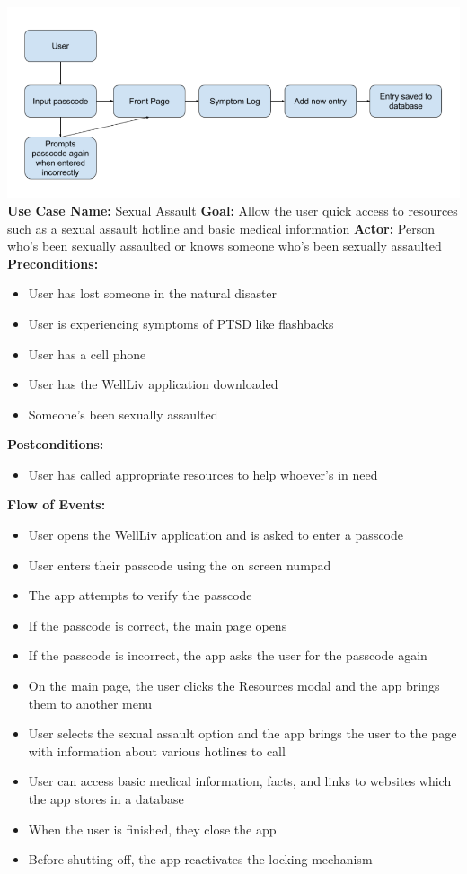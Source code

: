 \documentclass[letterpaper,12pt,titlepage]{article}
\begin{document}
\includegraphics[scale=.4]{Case1}
\newline
\newline
\textbf{Use Case Name:} Sexual Assault
\newline
\newline
\textbf{Goal:} Allow the user quick access to resources such as a sexual assault hotline and basic medical information
\newline
\newline
\textbf{Actor:} Person who’s been sexually assaulted or knows someone who’s been sexually assaulted
\newline
\newline
\textbf{Preconditions:}
\begin{itemize}
\item User has lost someone in the natural disaster
\item User is experiencing symptoms of PTSD like flashbacks
\item User has a cell phone
\item User has the WellLiv application downloaded
\item Someone’s been sexually assaulted
\end{itemize}
\textbf{Postconditions:}
\begin{itemize}
\item User has called appropriate resources to help whoever’s in need
\end{itemize}
\textbf{Flow of Events:}
\begin{itemize}
\item User opens the WellLiv application and is asked to enter a passcode
\item User enters their passcode using the on screen numpad
\item The app attempts to verify the passcode
\item If the passcode is correct, the main page opens
\item If the passcode is incorrect, the app asks the user for the passcode again
\item On the main page, the user clicks the Resources modal and the app brings them to another menu
\item User selects the sexual assault option and the app brings the user to the page with information about various hotlines to call
\item User can access basic medical information, facts, and links to websites which the app stores in a database
\item When the user is finished, they close the app
\item Before shutting off, the app reactivates the locking mechanism
\end{itemize}
\end{document}
